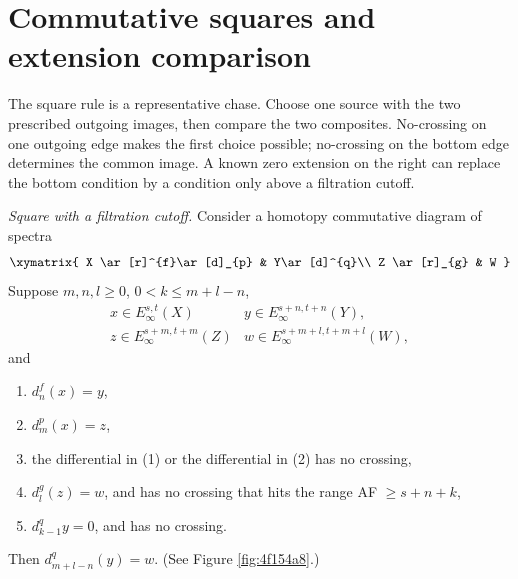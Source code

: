 

\section{Commutative squares and extension comparison}

The square rule is a representative chase. Choose one source with the
two prescribed outgoing images, then compare the two composites.
No-crossing on one outgoing edge makes the first choice possible;
no-crossing on the bottom edge determines the common image. A known
zero extension on the right can replace the bottom condition by a
condition only above a filtration cutoff.

\begin{theorem}
\label{paper:2.12}
\label{thm:4114f70c}
\label{paper:2.15}
\label{cor:0012nik}
\label{paper:2.16}
\label{cor:166dc180}
\label{paper:2.17}
\label{cor:290d35ce}

\textit{Square with a filtration cutoff.}
Consider a homotopy commutative diagram of spectra
    $$\xymatrix{
    X \ar[r]^{f}\ar[d]_{p} & Y\ar[d]^{q}\\
    Z \ar[r]_{g} & W
    }$$
    Suppose $m,n,l\ge 0$, $0<k\le m+l-n$,
    $$\begin{array}{ll}
        x\in E^{s,t}_\infty(X) & y\in E^{s+n,t+n}_\infty(Y),\\
        z\in E^{s+m,t+m}_\infty(Z) & w\in E^{s+m+l,t+m+l}_\infty(W),
    \end{array}$$
    and
    \begin{enumerate}
        \item $d^{f}_{n}(x)=y$,
        \item $d^{p}_{m}(x)=z$,
        \item the differential in (1) or the differential in (2) has no crossing,
        \item $d^{g}_{l}(z)=w$, and has no crossing that hits the range AF $\ge s+n+k$,
        \item $d^{q}_{k-1} y=0$, and has no crossing.
    \end{enumerate}
    Then $d^{q}_{m+l-n}(y)=w$. (See Figure \ref{fig:4f154a8}.)


\end{theorem}
